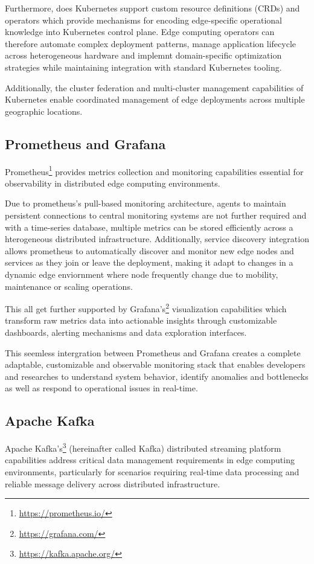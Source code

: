 Furthermore, does Kubernetes support custom resource definitions (CRDs) and operators which provide mechanisms for encoding edge-specific operational knowledge into Kubernetes control plane.
Edge computing operators can therefore automate complex deployment patterns, manage application lifecycle across heterogeneous hardware and implemnt domain-specific optimization strategies while maintaining integration with standard Kubernetes tooling.

Additionally, the cluster federation and multi-cluster management capabilities of Kubernetes enable coordinated management of edge deployments across multiple geographic locations.

\subsection{Prometheus and Grafana}
Prometheus\footnote{\url{https://prometheus.io/}} provides metrics collection and monitoring capabilities essential for observability in distributed edge computing environments.

Due to prometheus's pull-based monitoring architecture, agents to maintain persistent connections to central monitoring systems are not further required and with a time-series database, multiple metrics can be stored efficiently across a hterogeneous distributed infrastructure.
Additionally, service discovery integration allows prometheus to automatically discover and monitor new edge nodes and services as they join or leave the deployment, making it adapt to changes in a dynamic edge enviornment where node frequently change due to mobility, maintenance or scaling operations.

This all get further supported by Grafana's\footnote{\url{https://grafana.com/}} visualization capabilities which transform raw metrics data into actionable insights through customizable dashboards, alerting mechanisms and data exploration interfaces.

This seemless intergration between Prometheus and Grafana creates a complete adaptable, customizable and observable monitoring stack that enables developers and researches to understand system behavior, identify anomalies and bottlenecks as well as respond to operational issues in real-time.

\subsection{Apache Kafka}
Apache Kafka's\footnote{\url{https://kafka.apache.org/}} (hereinafter called Kafka) distributed streaming platform capabilities address critical data management requirements in edge computing environments, particularly for scenarios requiring real-time data processing and reliable message delivery across distributed infrastructure.

